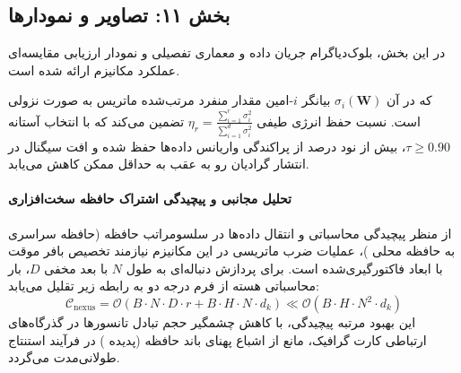 \begin{center}
\end{center}

\subsection*{بخش ۱۱: تصاویر و نمودارها }
در این بخش، بلوک‌دیاگرام جریان داده و معماری تفصیلی و نمودار ارزیابی مقایسه‌ای عملکرد مکانیزم  ارائه شده است.



که در آن $\sigma_i(\mathbf{W})$ بیانگر $i$-امین مقدار منفرد مرتب‌شده ماتریس به صورت نزولی است. نسبت حفظ انرژی طیفی $\eta_r = \frac{\sum_{i=1}^r \sigma_i^2}{\sum_{i=1}^{d} \sigma_i^2}$ تضمین می‌کند که با انتخاب آستانه $\tau \ge 0.90$، بیش از نود درصد از پراکندگی واریانس داده‌ها حفظ شده و افت سیگنال در انتشار گرادیان رو به عقب به حداقل ممکن کاهش می‌یابد.

\paragraph{تحلیل مجانبی و پیچیدگی اشتراک حافظه سخت‌افزاری}
از منظر پیچیدگی محاسباتی و انتقال داده‌ها در سلسومراتب حافظه (حافظه سراسری  به حافظه محلی )، عملیات ضرب ماتریسی در این مکانیزم نیازمند تخصیص بافر موقت با ابعاد فاکتورگیری‌شده است. برای پردازش دنباله‌ای به طول $N$ با بعد مخفی $D$، بار محاسباتی هسته از فرم درجه دو به رابطه زیر تقلیل می‌یابد:
\begin{equation}
\label{eq:complexity_nexus}
\mathcal{C}_{\text{nexus}} = \mathcal{O}\left( B \cdot N \cdot D \cdot r + B \cdot H \cdot N \cdot d_k \right) \ll \mathcal{O}\left( B \cdot H \cdot N^2 \cdot d_k \right)
\end{equation}
این بهبود مرتبه پیچیدگی، با کاهش چشمگیر حجم تبادل تانسورها در گذرگاه‌های ارتباطی کارت گرافیک، مانع از اشباع پهنای باند حافظه (پدیده ) در فرآیند استنتاج طولانی‌مدت می‌گردد.